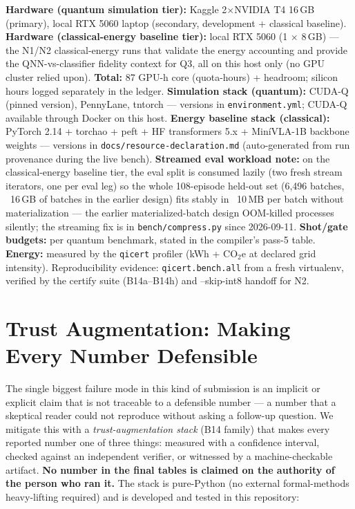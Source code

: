 \documentclass[conference,10pt]{IEEEtran}
\begin{document}
\textbf{Hardware (quantum simulation tier):} Kaggle 2$\times$NVIDIA T4 16\,GB (primary), local RTX 5060 laptop (secondary, development + classical baseline).  
\textbf{Hardware (classical-energy baseline tier):} local RTX 5060 (1$\,\times\,$8\,GB) — the N1/N2 classical-energy runs that validate the energy accounting and provide the QNN-vs-classifier fidelity context for Q3, 
all on this host only (no GPU cluster relied upon).  
\textbf{Total:} 87 GPU-h core (quota-hours) + headroom; silicon hours logged separately in the ledger.  
\textbf{Simulation stack (quantum):} CUDA-Q (pinned version), PennyLane, tntorch --- versions in \texttt{environment.yml}; CUDA-Q available through Docker on this host.  
\textbf{Energy baseline stack (classical):} PyTorch 2.14 + torchao + peft + HF transformers 5.x + Min\'iVLA-1B backbone weights --- versions in \texttt{docs/resource-declaration.md} (auto-generated from run provenance during the live bench).  
\textbf{Streamed eval workload note:} on the classical-energy baseline tier, the eval split is consumed lazily (two fresh stream iterators, one per eval leg) so the whole 108-episode held-out set (6{,}496 batches, ~16\,GB of batches in the earlier design) fits stably in ~10\,MB per batch without materialization --- the earlier materialized-batch design OOM-killed processes silently; the streaming fix is in \texttt{bench/compress.py} since 2026-09-11.
\textbf{Shot/gate budgets:} per quantum benchmark, stated in the compiler's pass-5 table.  
\textbf{Energy:} measured by the \texttt{qicert} profiler (kWh + CO$_2$e at declared grid intensity). Reproducibility evidence: \texttt{qicert.bench.all} from a fresh virtualenv, verified by the certify suite (B14a--B14h) and --skip-int8 handoff for N2.

\section{Trust Augmentation: Making Every Number Defensible}
\label{sec:trust}

The single biggest failure mode in this kind of submission is an implicit or
explicit claim that is not traceable to a defensible number --- a number that
a skeptical reader could not reproduce without asking a follow-up question. We
mitigate this with a \emph{trust-augmentation stack} (B14 family) that makes
every reported number one of three things: measured with a confidence interval,
checked against an independent verifier, or witnessed by a machine-checkable
artifact. \textbf{No number in the final tables is claimed on the authority of
the person who ran it.} The stack is pure-Python (no external formal-methods
heavy-lifting required) and is developed and tested in this repository:
\end{document}
